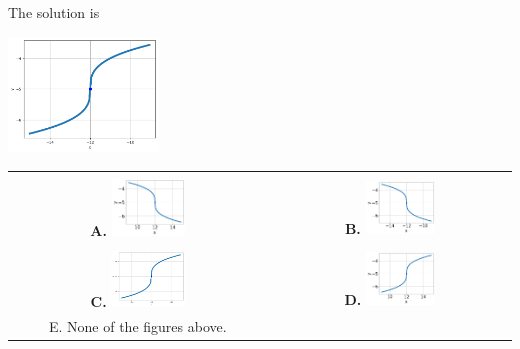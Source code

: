 \documentclass{article}[14pt]
\begin{document}
 
 The solution is  
 \begin{center} \includegraphics[width=0.3\textwidth]{../Figures/radicalEquationToGraphCC.png} \end{center}\begin{tabular}{|c|c|} 
\hline 
 & \tabularnewline 
 \textbf{A.} \includegraphics[width=0.3\textwidth]{../Figures/radicalEquationToGraphCA.png} & \textbf{B.} \includegraphics[width=0.3\textwidth]{../Figures/radicalEquationToGraphCB.png} \tabularnewline 
\hline 
 & \tabularnewline 
 \textbf{C.} \includegraphics[width=0.3\textwidth]{../Figures/radicalEquationToGraphCC.png} & \textbf{D.} \includegraphics[width=0.3\textwidth]{../Figures/radicalEquationToGraphCD.png} \tabularnewline 
\hline 
 E. None of the figures above. & \tabularnewline 
\hline 
 \end{tabular} 
 
\end{document}
